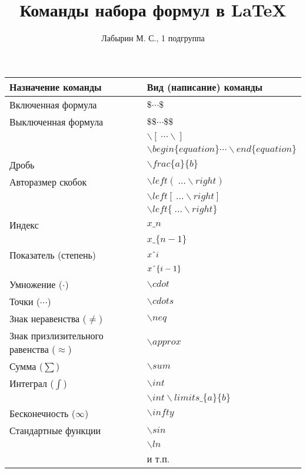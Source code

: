 \documentclass[12pt]{article}
\author{Лабырин М. С., 1 подгруппа}
\title{Команды набора формул в \LaTeX}
\begin{document}
\maketitle

\begin{center}
  \begin{tabular}{ || l | l || }

    \hline
    Назначение команды & Вид (написание) команды \\ \hline
    \hline

    Включенная формула &
    $\$ \cdots \$$ \\ \hline

    Выключенная формула &
    $\$\$ \cdots \$\$$ \\ &
    $\backslash[~\cdots \backslash]$ \\ &
    $\backslash begin\{equation\} \cdots \backslash end \{equation\}$ \\ \hline

    Дробь &
    $\backslash frac\{a\}\{b\}$ \\ \hline

    Авторазмер скобок &
    $\backslash left (~\ldots \backslash right )$ \\ &
    $\backslash left [~\ldots \backslash right ]$ \\ &
    $\backslash left \{~\ldots \backslash right \}$ \\ \hline

    Индекс &
    $x\_n$ \\ &
    $x\_\{n - 1\}$ \\ \hline

    Показатель (степень) &
    $x\string^i$ \\ &
    $x\string^\{i - 1\}$ \\ \hline

    Умножение ($\cdot$) &
    $\backslash cdot$ \\ \hline

    Точки ($\cdots$) &
    $\backslash cdots$ \\ \hline

    Знак неравенства ($\neq$) &
    $\backslash neq$ \\ \hline

    Знак призлизительного равенства ($\approx$) &
    $\backslash approx$ \\ \hline

    Сумма ($\sum$) &
    $\backslash sum$ \\ \hline

    Интеграл ($\int$) &
    $\backslash int$ \\ &
    $\backslash int \backslash limits\_\{a\}\{b\}$ \\ \hline

    Бесконечность ($\infty$) &
    $\backslash infty$ \\ \hline

    Стандартные функции &
    $\backslash sin$ \\ &
    $\backslash ln$ \\ &
    и т.п. \\ \hline

  \end{tabular}
\end{center}
\end{document}
